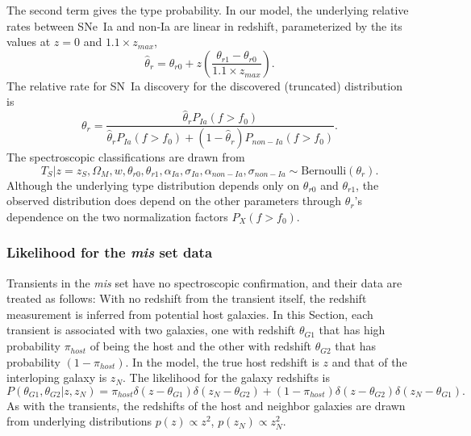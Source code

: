 \documentclass[preprint,3p]{elsarticle}
\begin{document}
The second term gives the type probability. In our model,
the underlying relative rates between SNe~Ia and non-Ia are linear in redshift,
 parameterized by the
its values at $z=0$ and $1.1 \times z_{max}$, 
\begin{equation}
\hat{\theta}_r=\theta_{r0}+z\left(\frac{\theta_{r1}-\theta_{r0}}{1.1 \times z_{max}}\right).
\label{rate:eqn}
\end{equation}
The relative rate for SN~Ia discovery for the discovered (truncated) distribution is
\begin{equation}
\theta_r=\frac{\hat{\theta}_rP_{Ia}(f > f_0)}{\hat{\theta}_{r}P_{Ia}(f > f_0) + (1-\hat{\theta}_{r})P_{non-Ia}(f > f_0)}.
\end{equation}
The spectroscopic classifications are drawn from
\begin{equation}
T_S | z=z_S, \Omega_M, w, \theta_{r0}, \theta_{r1} , \alpha_{Ia},\sigma_{Ia}, \alpha_{\mathit{non-Ia}},\sigma_{\mathit{non-Ia}} \sim \text{Bernoulli}(\theta_r).
\end{equation}
Although the underlying type distribution depends only on $ \theta_{r0}$ and $ \theta_{r1}$,  
the observed distribution does depend on the other parameters through $\theta_r$'s dependence on
the two normalization factors
$P_{X}(f > f_0)$.



\subsubsection{Likelihood for the {\it mis} set data}

Transients in the {\it mis}
set have no spectroscopic confirmation, and their data are treated as follows:
With no redshift from the transient itself, 
the redshift measurement is inferred from potential host galaxies.
In this Section, each transient is associated with two galaxies, one 
with redshift $\theta_{G1}$
that has high probability $\pi_{host}$
of being the host and the other
with redshift $\theta_{G2}$ that has probability $(1-\pi_{host})$.
In the model, the
true host redshift is $z$ and that of the interloping galaxy is $z_N$.
The likelihood for the galaxy redshifts is
\begin{equation}
P(\theta_{G1},\theta_{G2}|z, z_N) =
	\pi_{host}\delta(z-\theta_{G1})\delta(z_N-\theta_{G2}) +
	(1-\pi_{host}) \delta(z-\theta_{G2})\delta(z_N-\theta_{G1}).
\end{equation}
As with the transients, the redshifts of the host
 and neighbor galaxies are drawn from underlying distributions $p(z) \propto z^2$, $p(z_N) \propto z^2_N$.
\end{document}
